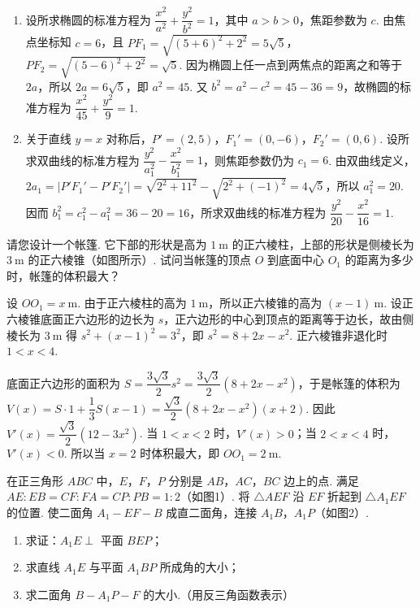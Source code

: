 \begin{solution}
\begin{enumerate}
\item 设所求椭圆的标准方程为 \(\dfrac{x^2}{a^2}+\dfrac{y^2}{b^2}=1\)，其中 \(a>b>0\)，焦距参数为 \(c\). 由焦点坐标知 \(c=6\)，且
\(PF_1=\sqrt{(5+6)^2+2^2}=5\sqrt{5}\)，\(PF_2=\sqrt{(5-6)^2+2^2}=\sqrt{5}\). 因为椭圆上任一点到两焦点的距离之和等于 \(2a\)，所以 \(2a=6\sqrt{5}\)，即 \(a^2=45\). 又 \(b^2=a^2-c^2=45-36=9\)，故椭圆的标准方程为 \(\dfrac{x^2}{45}+\dfrac{y^2}{9}=1\).
\item 关于直线 \(y=x\) 对称后，\(P'=(2,5)\)，\(F_1'=(0,-6)\)，\(F_2'=(0,6)\). 设所求双曲线的标准方程为 \(\dfrac{y^2}{a_1^2}-\dfrac{x^2}{b_1^2}=1\)，则焦距参数仍为 \(c_1=6\). 由双曲线定义，\(2a_1=|P'F_1'-P'F_2'|=\sqrt{2^2+11^2}-\sqrt{2^2+(-1)^2}=4\sqrt{5}\)，所以 \(a_1^2=20\). 因而 \(b_1^2=c_1^2-a_1^2=36-20=16\)，所求双曲线的标准方程为 \(\dfrac{y^2}{20}-\dfrac{x^2}{16}=1\).
\end{enumerate}
\end{solution}

\begin{problem}
请您设计一个帐篷. 它下部的形状是高为 \(1\mathrm{~m}\) 的正六棱柱，上部的形状是侧棱长为 \(3\mathrm{~m}\) 的正六棱锥（如图所示）. 试问当帐篷的顶点 \(O\) 到底面中心 \(O_{1}\) 的距离为多少时，帐篷的体积最大？

\end{problem}

\begin{solution}
设 \(OO_{1}=x\mathrm{~m}\). 由于正六棱柱的高为 \(1\mathrm{~m}\)，所以正六棱锥的高为 \((x-1)\mathrm{~m}\). 设正六棱锥底面正六边形的边长为 \(s\)，正六边形的中心到顶点的距离等于边长，故由侧棱长为 \(3\mathrm{~m}\) 得
\(s^2+(x-1)^2=3^2\)，即 \(s^2=8+2x-x^2\). 正六棱锥非退化时 \(1<x<4\).

底面正六边形的面积为 \(S=\dfrac{3\sqrt{3}}{2}s^2=\dfrac{3\sqrt{3}}{2}(8+2x-x^2)\)，于是帐篷的体积为
\(V(x)=S\cdot1+\dfrac13S(x-1)=\dfrac{\sqrt{3}}{2}(8+2x-x^2)(x+2)\).
因此 \(V'(x)=\dfrac{\sqrt{3}}{2}(12-3x^2)\). 当 \(1<x<2\) 时，\(V'(x)>0\)；当 \(2<x<4\) 时，\(V'(x)<0\). 所以当 \(x=2\) 时体积最大，即 \(OO_{1}=2\mathrm{~m}\).
\end{solution}

\begin{problem}
在正三角形 \(ABC\) 中，\(E\)，\(F\)，\(P\) 分别是 \(AB\)，\(AC\)，\(BC\) 边上的点. 满足 \(AE:EB=CF:FA=CP:PB=1:2\)（如图1）. 将 \(\triangle AEF\) 沿 \(EF\) 折起到 \(\triangle A_{1}EF\) 的位置. 使二面角 \(A_{1}-EF-B\) 成直二面角，连接 \(A_{1}B\)，\(A_{1}P\)（如图2）.

\begin{enumerate}
\item 求证：\(A_{1}E \perp\) 平面 \(BEP\)；
\item 求直线 \(A_{1}E\) 与平面 \(A_{1}BP\) 所成角的大小；
    \item 求二面角 \(B - A_{1}P - F\) 的大小.（用反三角函数表示）
\end{enumerate}

\end{problem}

